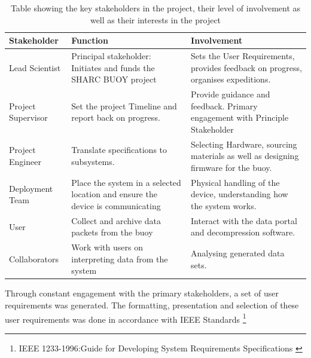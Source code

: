 \begin{table}[H]
    \centering
    \caption{Table showing the key stakeholders in the project, their level of involvement as well as their interests in the project}
    \begin{tabular}{ | >{\RaggedRight}m{} | >{\RaggedRight}m{} |>{\RaggedRight}m{} | }
    \hline
         Stakeholder &  Function & Involvement\\
         \hline
         Lead Scientist \hfill & Principal stakeholder: Initiates and funds the SHARC BUOY project & Sets the User Requirements, provides feedback on progress, organises expeditions.  \\
         \hline
         Project Supervisor & Set the project Timeline and report back on progress.\hfill& Provide guidance and feedback. Primary engagement with Principle Stakeholder\\
         \hline
         Project Engineer & Translate specifications to subsystems.& Selecting Hardware, sourcing materials as well as designing firmware for the buoy. \\
         \hline
         Deployment Team & Place the system in a selected location and ensure the device is communicating & Physical handling of the device, understanding how the system works.\\
         \hline
         User & Collect and archive data packets from the buoy & Interact with the data portal and decompression software.\\
         \hline
         Collaborators & Work with users on interpreting data from the system & Analysing generated data sets.\\
         \hline
    \end{tabular}

\end{table}

Through constant engagement with the primary stakeholders, a set of user requirements was generated. The formatting, presentation and selection of these user requirements was done in accordance with IEEE Standards \footnote{IEEE 1233-1996:Guide for Developing System Requirements Specifications \cite{IEEE_STD_UREQ}}

